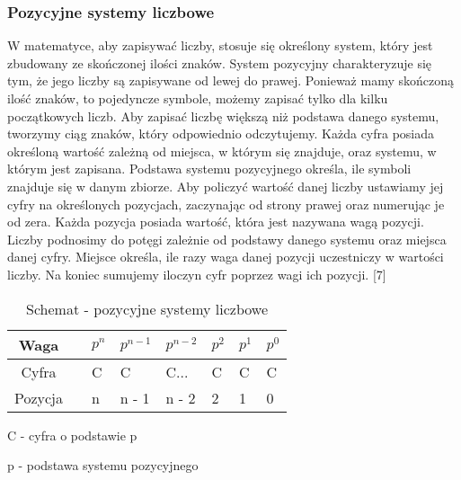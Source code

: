 \documentclass[12pt, a4paper, onside, polish]{article}				%
\begin{document}
\subsubsection{Pozycyjne systemy liczbowe}
\hspace{\parindent}
W matematyce, aby zapisywać liczby, stosuje się określony system, który jest zbudowany ze skończonej ilości znaków. System pozycyjny charakteryzuje się tym, że jego liczby są zapisywane od lewej do prawej. Ponieważ mamy skończoną ilość znaków, to pojedyncze symbole, możemy zapisać tylko dla kilku początkowych liczb. Aby zapisać liczbę większą niż podstawa danego systemu, tworzymy ciąg znaków, który odpowiednio odczytujemy. Każda cyfra posiada określoną wartość zależną od miejsca, w którym się znajduje, oraz systemu, w którym jest zapisana. Podstawa systemu pozycyjnego określa, ile symboli znajduje się w danym zbiorze. Aby policzyć wartość danej liczby ustawiamy jej cyfry na określonych pozycjach, zaczynając od strony prawej oraz numerując je od zera. Każda pozycja posiada wartość, która jest nazywana wagą pozycji. Liczby podnosimy do potęgi zależnie od podstawy danego systemu oraz miejsca danej cyfry. Miejsce określa, ile razy waga danej pozycji uczestniczy w wartości liczby. Na koniec sumujemy iloczyn cyfr poprzez wagi ich pozycji. [7]


\begin{table}[H]
\caption{Schemat - pozycyjne systemy liczbowe}
\centering
\begin{tabular}{|cl|l|l|l|l|l|l|}
\hline
Waga    &  & $p^{n}$ & $p^{n - 1}$ & $p^{n - 2}$ & $p^{2}$ & $p^{1}$ & $p^{0}$ \\ \hline
Cyfra   &  & C                    & C                      & C...                   & C                    & C                    & C                    \\ \hline
Pozycja &  & n                    & n - 1                    & n - 2                    & 2                    & 1                    & 0                    \\ \hline
\end{tabular}
\end{table}

C - cyfra o podstawie p

p - podstawa systemu pozycyjnego
\end{document}
